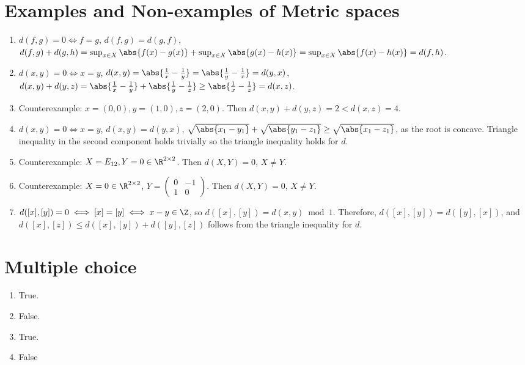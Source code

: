\documentclass{article}
\begin{document}

\section{Examples and Non-examples of Metric spaces}
\begin{enumerate}
    \item $d(f, g) = 0 \iff f = g$, $d(f, g) = d(g, f)$, $d(f, g) + d(g, h) = \sup_{x \in X} \abs{f(x) - g(x)} + \sup_{x \in X} \abs{g(x) - h(x)} = \sup_{x \in X} \abs{f(x) - h(x)} = d(f, h)$.

    \item $d(x, y) = 0 \iff x = y$, $d(x, y) = \abs{\frac{1}{x} - \frac{1}{y}} = \abs{\frac{1}{y} - \frac{1}{x}} = d(y, x)$, $d(x, y) + d(y, z) = \abs{\frac{1}{x} - \frac{1}{y}} + \abs{\frac{1}{y} - \frac{1}{z}} \geq \abs{\frac{1}{x} - \frac{1}{z}} = d(x, z)$.

    \item Counterexample: $x = (0, 0), y = (1, 0), z = (2, 0)$. Then $d(x, y) + d(y, z) = 2 < d(x, z) = 4$.
    
    \item $d(x, y) = 0 \iff x = y$, $d(x, y) = d(y, x)$, $\sqrt{\abs{x_1 - y_1}} + \sqrt{\abs{y_1 - z_1}} \geq \sqrt{\abs{x_1 - z_1}}$, as the root is concave. Triangle inequality in the second component holds trivially so the triangle inequality holds for $d$.

    \item Counterexample: $X = E_{12}, Y = 0 \in \R^{2\times 2}$. Then $d(X, Y) = 0$, $X \neq Y$.
    
    \item Counterexample: $X = 0 \in \R^{2\times 2}$, $Y = \begin{pmatrix} 0 &  -1 \\ 1 & 0 \end{pmatrix}$. Then $d(X, Y) = 0$, $X \neq Y$.
    
    \item $d([x], [y]) = 0 \iff [x] = [y] \iff x - y \in \Z$, so $d([x], [y]) = d(x, y) \bmod 1$. Therefore, $d([x], [y]) = d([y], [x])$, and $d([x], [z]) \leq d([x], [y]) + d([y], [z])$ follows from the triangle inequality for $d$.
\end{enumerate}

\section{Multiple choice}
\begin{enumerate}
    \item True. 
    \item False.
    \item True. 
    \item False
\end{enumerate}
\end{document}
